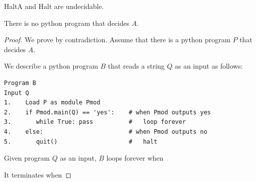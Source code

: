 
\begin{frame}
  \begin{lemma}
    {\sc HaltA} and {\sc Halt} are undecidable.
  \end{lemma}
\end{frame}

\begin{frame}[fragile=true]

  \begin{lemma}
    There is no python program that decides $A$.
  \end{lemma}
  \begin{proof}
    We prove by contradiction. Assume that there is a python program
    $P$ that decides $A$.  \pause

    We describe a python program $B$ that reads a string $Q$ as an
    input as follows:

    {\small
\begin{verbatim}
Program B
Input Q
1.    Load P as module Pmod
2.    if Pmod.main(Q) == 'yes':    # when Pmod outputs yes
3.       while True: pass          #   loop forever 
4.    else:                        # when Pmod outputs no
5.       quit()                    #   halt
\end{verbatim}
    }

    Given program $Q$ as an input, $B$ loops forever when \pause

    It terminates when
  \end{proof}
\end{frame}

